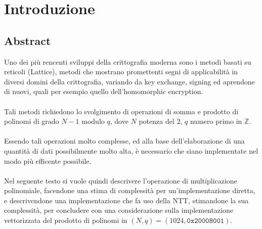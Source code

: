 \section{Introduzione}
\subsection{Abstract}
Uno dei più rencenti sviluppi della crittografia moderna sono i metodi basati
su reticoli (Lattice), metodi che mostrano promettenti segni di applicabilità
in diversi domini della crittografia, variando da key exchange, signing ed
aprendone di nuovi, quali per esempio quello dell'homomorphic encryption.\\
\\
Tali metodi richiedono lo svolgimento di operazioni di somma e prodotto di
polinomi di grado $N-1$ modulo $q$, dove $N$ potenza del 2, $q$ numero primo in
$\mathbb{Z}$.\\
\\
Essendo tali operazioni molto complesse, ed alla base dell'elaborazione di una
quantità di dati possibilmente molto alta, è necessario che siano implementate
nel modo più efficente possibile.\\
\\
Nel seguente testo si vuole quindi descrivere l'operazione di multiplicazione
polinomiale, facendone una stima di complessità per un'implementazione
diretta, e descrivendone una implementazione che fa uso della NTT,
stimandone la sua complessità, per concludere con una considerazione sulla
implementazione vettorizzata del prodotto di polinomi in
$(N, q) = (1024, \mathtt{0x20008001})$.\\
